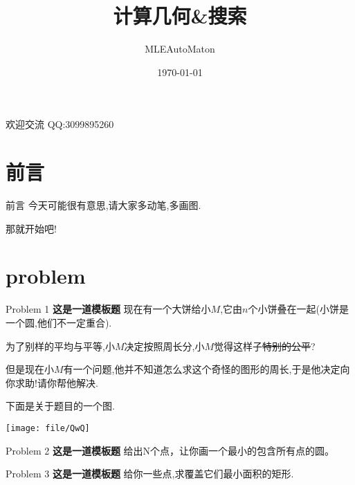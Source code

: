 \documentclass[mathserif]{beamer} %
\title{计算几何\&搜索}
\author{MLEAutoMaton}
\institute{长郡中学}
\date{\today}
\begin{document}
	\begin{frame}
	\titlepage
	\begin{center}
		{\tiny 欢迎交流 QQ:3099895260}
	\end{center}
\end{frame}
\section{前言}
\begin{frame}{前言}
今天可能很有意思,请大家多动笔,多画图.\pause\newline

那就开始吧!
\end{frame}
\section{problem}
\begin{frame}{Problem 1}
\textbf{这是一道模板题}\newline \pause
现在有一个大饼给小$M$,它由$n$个小饼叠在一起(小饼是一个圆,他们不一定重合).

为了别样的平均与平等,小$M$决定按照周长分,小$M$觉得这样子\sout{特别的公平}?

但是现在小$M$有一个问题,他并不知道怎么求这个奇怪的图形的周长,于是他决定向你求助!请你帮他解决.

下面是关于题目的一个图.\newline

\texttt{[image: file/QwQ]}

\end{frame}
\begin{frame}{Problem 2}
\textbf{这是一道模板题}\newline \pause
给出N个点，让你画一个最小的包含所有点的圆。

\end{frame}
\begin{frame}{Problem 3}
\textbf{这是一道模板题}\newline\pause
给你一些点,求覆盖它们最小面积的矩形.
\end{frame}
\end{document}
